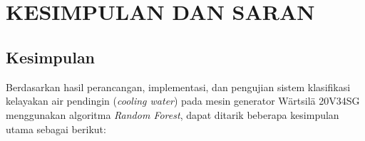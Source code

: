 
\chapter[KESIMPULAN DAN SARAN]{\\ KESIMPULAN DAN SARAN}

\section{Kesimpulan}
Berdasarkan hasil perancangan, implementasi, dan pengujian sistem klasifikasi kelayakan air pendingin (\textit{cooling water}) pada mesin generator W{\"a}rtsil{\"a} 20V34SG menggunakan algoritma \textit{Random Forest}, dapat ditarik beberapa kesimpulan utama sebagai berikut:
